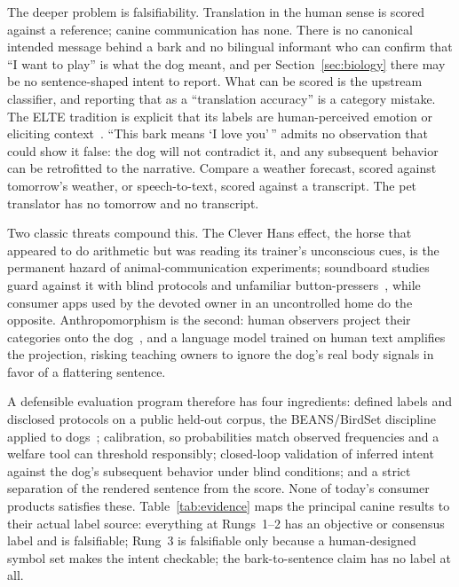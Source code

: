The deeper problem is falsifiability. Translation in the human sense is
scored against a reference; canine communication has none. There is no
canonical intended message behind a bark and no bilingual informant who can
confirm that ``I want to play'' is what the dog meant, and per
Section~\ref{sec:biology} there may be no sentence-shaped intent to report.
What can be scored is the upstream classifier, and reporting that as a
``translation accuracy'' is a category mistake. The ELTE tradition is
explicit that its labels are human-perceived emotion or eliciting
context~\cite{pongracz2006acoustic,icassp2018dogbark}. ``This bark means `I
love you'\,'' admits no observation that could show it false: the dog will
not contradict it, and any subsequent behavior can be retrofitted to the
narrative. Compare a weather forecast, scored against tomorrow's weather,
or speech-to-text, scored against a transcript. The pet translator has no
tomorrow and no transcript.

Two classic threats compound this. The Clever Hans effect, the horse that
appeared to do arithmetic but was reading its trainer's unconscious cues,
is the permanent hazard of animal-communication experiments; soundboard
studies guard against it with blind protocols and unfamiliar
button-pressers~\cite{bastos2024plos}, while consumer apps used by the
devoted owner in an uncontrolled home do the opposite. Anthropomorphism is
the second: human observers project their categories onto the
dog~\cite{sci2022explainable}, and a language model trained on human text
amplifies the projection, risking teaching owners to ignore the dog's real
body signals in favor of a flattering sentence.

A defensible evaluation program therefore has four ingredients: defined
labels and disclosed protocols on a public held-out corpus, the BEANS/BirdSet
discipline applied to dogs~\cite{hagiwara2023beans}; calibration, so
probabilities match observed frequencies and a welfare tool can threshold
responsibly; closed-loop validation of inferred intent against the dog's
subsequent behavior under blind conditions; and a strict separation of the
rendered sentence from the score. None of today's consumer products
satisfies these. Table~\ref{tab:evidence} maps the principal canine results
to their actual label source: everything at Rungs~1--2 has an objective or
consensus label and is falsifiable; Rung~3 is falsifiable only because a
human-designed symbol set makes the intent checkable; the bark-to-sentence
claim has no label at all.

